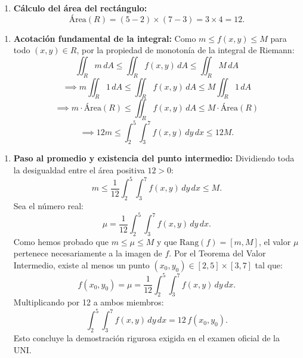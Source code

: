 \documentclass[11pt,a4paper]{article}
\begin{document}
\begin{enumerate}[label=\textbf{\arabic*.}]
\item \textbf{Cálculo del área del rectángulo:}
\begin{equation*}
\text{Área}(R) = (5 - 2) \times (7 - 3) = 3 \times 4 = 12.
\end{equation*}
\end{enumerate}

\begin{enumerate}[label=\textbf{\arabic*.}]
\item \textbf{Acotación fundamental de la integral:}
Como $m \le f(x,y) \le M$ para todo $(x,y) \in R$, por la propiedad de monotonía de la integral de Riemann:
\begin{equation*}
\iint_R m \, dA \le \iint_R f(x,y) \, dA \le \iint_R M \, dA
\end{equation*}
\begin{equation*}
\implies m \iint_R 1 \, dA \le \iint_R f(x,y) \, dA \le M \iint_R 1 \, dA
\end{equation*}
\begin{equation*}
\implies m \cdot \text{Área}(R) \le \iint_R f(x,y) \, dA \le M \cdot \text{Área}(R)
\end{equation*}
\begin{equation*}
\implies 12 m \le \int_2^5 \int_3^7 f(x,y) \, dy \, dx \le 12 M.
\end{equation*}
\end{enumerate}

\begin{enumerate}[label=\textbf{\arabic*.}]
\item \textbf{Paso al promedio y existencia del punto intermedio:}
Dividiendo toda la desigualdad entre el área positiva $12 > 0$:
\begin{equation*}
m \le \frac{1}{12} \int_2^5 \int_3^7 f(x,y) \, dy \, dx \le M.
\end{equation*}
Sea el número real:
\begin{equation*}
\mu = \frac{1}{12} \int_2^5 \int_3^7 f(x,y) \, dy \, dx.
\end{equation*}
Como hemos probado que $m \le \mu \le M$ y que $\text{Rang}(f) = [m, M]$, el valor $\mu$ pertenece necesariamente a la imagen de $f$.
Por el Teorema del Valor Intermedio, existe al menos un punto $(x_0, y_0) \in [2, 5] \times [3, 7]$ tal que:
\begin{equation*}
f(x_0, y_0) = \mu = \frac{1}{12} \int_2^5 \int_3^7 f(x,y) \, dy \, dx.
\end{equation*}
Multiplicando por 12 a ambos miembros:
\begin{equation*}
\int_2^5 \int_3^7 f(x,y) \, dy \, dx = 12 \, f(x_0, y_0).
\end{equation*}
Esto concluye la demostración rigurosa exigida en el examen oficial de la UNI.
\end{enumerate}
\end{document}
